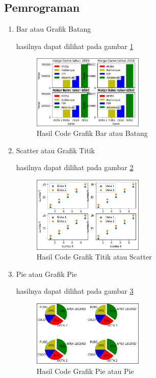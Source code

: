 \subsection{Pemrograman}
\begin{enumerate}
\item Bar atau Grafik Batang

\par hasilnya dapat dilihat pada gambar \ref{data4}
\begin{figure} [!htbp]
	\centerline{\includegraphics[width=0.5\textwidth]{figures/chapter6/1164074/4}}
	\caption{Hasil Code Grafik Bar atau Batang}
	\label{data4}
\end{figure}

\item Scatter atau Grafik Titik

\par hasilnya dapat dilihat pada gambar \ref{data5}
\begin{figure} [!htbp]
	\centerline{\includegraphics[width=0.5\textwidth]{figures/chapter6/1164074/7}}
	\caption{Hasil Code Grafik Titik atau Scatter}
	\label{data5}
\end{figure}

\item Pie atau Grafik Pie

\par hasilnya dapat dilihat pada gambar \ref{data6}
\begin{figure} [!htbp]
	\centerline{\includegraphics[width=0.5\textwidth]{figures/chapter6/1164074/6}}
	\caption{Hasil Code Grafik Pie atau Pie}
	\label{data6}
\end{figure}


\end{enumerate}
